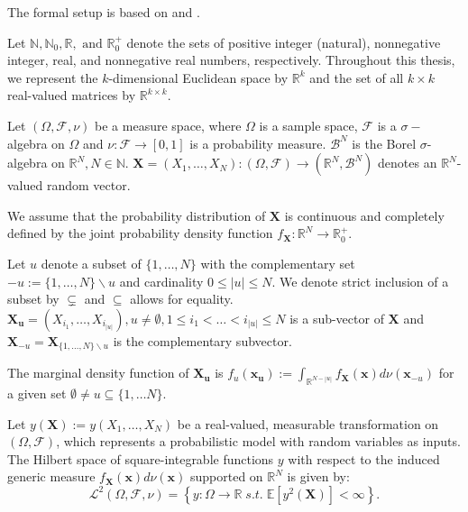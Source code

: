 The formal setup is based on \cite{rahman2014} and \cite{chastaing2012}.\par
Let $\mathbb{N}, \mathbb{N}_0, \mathbb{R}, \text{ and } \mathbb{R}_0^{+}$ denote the sets of positive integer (natural), nonnegative integer, real, and nonnegative real numbers, respectively. Throughout this thesis, we represent the $k$-dimensional Euclidean space by $\mathbb{R}^k$ and the set of all $k \times k$ real-valued matrices by $\mathbb{R}^{k \times k}$.\par
Let $(\Omega, \mathcal{F}, \nu)$ be a measure space, where $\Omega$ is a sample space, $\mathcal{F}$ is a $\sigma-$algebra on $\Omega$ and $\nu: \mathcal{F} \rightarrow [0, 1]$ is a probability measure. $\mathcal{B}^N$ is the Borel $\sigma$-algebra on $\mathbb{R}^N, N \in \mathbb{N}$.
$\boldsymbol{X} = (X_1, \dots, X_N): (\Omega, \mathcal{F}) \rightarrow (\mathbb{R}^N, \mathcal{B}^N)$ denotes an $\mathbb{R}^N$-valued random vector.\par
We assume that the probability distribution of $\boldsymbol{X}$ is continuous and completely defined by the joint probability density function $f_{\boldsymbol{X}}: \mathbb{R}^N \rightarrow \mathbb{R}_{0}^+$. %

Let $u$ denote a subset of $\{1, \dots, N\}$ with the complementary set  $-u := \{1, \dots, N\} \backslash{} u$ and cardinality $0 \leq |u| \leq N$. We denote strict inclusion of a subset by $\subsetneq$ and $\subseteq$ allows for equality.
$\boldsymbol{X_u} = (X_{i_1}, \dots, X_{i_{|u|}}), u \neq \emptyset, 1 \leq i_1 < \dots < i_{|u|} \leq N$ is a sub-vector of $\boldsymbol{X}$ and $\boldsymbol{X}_{-u} = \boldsymbol{X}_{\{1, \dots, N\} \backslash{} u}$ is the complementary subvector.

The marginal density function of $\boldsymbol{X_u}$ is $f_u(\boldsymbol{x_u}) := \int_{\mathbb{R}^{N-|u|}} f_{\boldsymbol{X}}(\boldsymbol{x})d \nu (\boldsymbol{x}_{-u})$ for a given set $\emptyset \neq u \subseteq \{1, \dots N\}$.\par
Let $y(\boldsymbol{X}) := y(X_1, \dots, X_N)$ be a real-valued, measurable transformation on $(\Omega, \mathcal{F})$, which represents a probabilistic model with random variables as inputs. The Hilbert space of square-integrable functions $y$ with respect to the induced generic measure $f_{\boldsymbol{X}}(\boldsymbol{x})d \nu (\boldsymbol{x})$ supported on $\mathbb{R}^N$ is given by:
\[
\mathcal{L}^2(\Omega, \mathcal{F}, \nu) = \left\{ y: \Omega \rightarrow \mathbb{R} \; \textit{s.t.} \; \mathbb{E}[y^2(\boldsymbol{X})] < \infty \right\}.
\]

